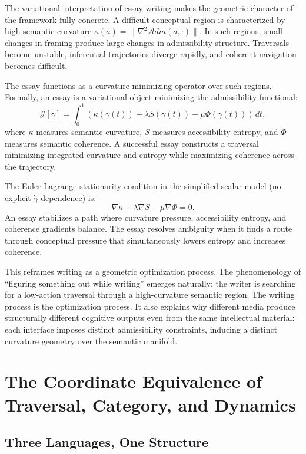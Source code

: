 \documentclass[12pt,oneside]{book}
\theoremstyle{plain}
\theoremstyle{definition}
\theoremstyle{plain}
\begin{document}
The variational interpretation of essay writing makes the geometric character of the framework fully concrete. A difficult conceptual region is characterized by high semantic curvature $\kappa(a) = \|\nabla^2 \mathcal{A}dm(a, \cdot)\|$. In such regions, small changes in framing produce large changes in admissibility structure. Traversals become unstable, inferential trajectories diverge rapidly, and coherent navigation becomes difficult.

The essay functions as a curvature-minimizing operator over such regions. Formally, an essay is a variational object minimizing the admissibility functional:
\[
\mathcal{J}[\gamma]
=
\int_0^1
\left(
\kappa(\gamma(t))
+
\lambda S(\gamma(t))
-
\mu \Phi(\gamma(t))
\right)\,dt,
\]
where $\kappa$ measures semantic curvature, $S$ measures accessibility entropy, and $\Phi$ measures semantic coherence. A successful essay constructs a traversal minimizing integrated curvature and entropy while maximizing coherence across the trajectory.

The Euler-Lagrange stationarity condition in the simplified scalar model (no explicit $\dot\gamma$ dependence) is:
\[
\nabla \kappa + \lambda \nabla S - \mu \nabla \Phi = 0.
\]
An essay stabilizes a path where curvature pressure, accessibility entropy, and coherence gradients balance. The essay resolves ambiguity when it finds a route through conceptual pressure that simultaneously lowers entropy and increases coherence.

This reframes writing as a geometric optimization process. The phenomenology of ``figuring something out while writing'' emerges naturally: the writer is searching for a low-action traversal through a high-curvature semantic region. The writing process is the optimization process. It also explains why different media produce structurally different cognitive outputs even from the same intellectual material: each interface imposes distinct admissibility constraints, inducing a distinct curvature geometry over the semantic manifold.

\chapter{The Coordinate Equivalence of Traversal, Category, and Dynamics}
\label{ch:equivalence}

\section{Three Languages, One Structure}
\end{document}
